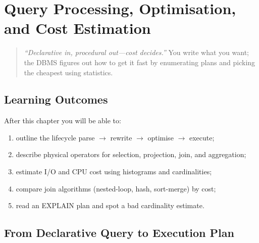 \chapter{Query Processing, Optimisation, and Cost Estimation}
\label{ch:query}

\begin{quote}
\emph{``Declarative in, procedural out---cost decides.''} You write what you want; the DBMS figures out how to get it fast by enumerating plans and picking the cheapest using statistics.
\end{quote}

\noindent{}
\vspace{0.4em}

\section*{Learning Outcomes}
After this chapter you will be able to:
\begin{enumerate}[label=(L\arabic*)]
    \item outline the lifecycle parse $\to$ rewrite $\to$ optimise $\to$ execute;
    \item describe physical operators for selection, projection, join, and aggregation;
    \item estimate I/O and CPU cost using histograms and cardinalities;
    \item compare join algorithms (nested-loop, hash, sort-merge) by cost;
    \item read an EXPLAIN plan and spot a bad cardinality estimate.
\end{enumerate}

\section{From Declarative Query to Execution Plan}
\label{sec:lifecycle}

